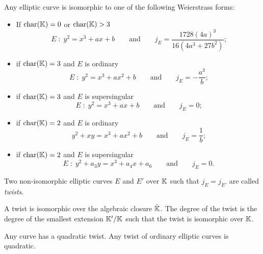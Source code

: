 \begin{proposition}
  Any elliptic curve is isomorphic to one of the following Weierstrass
  forms:
  \begin{itemize}
  \item If $\operatorname{char}(\mathbb{K})=0$ or $\operatorname{char}(\mathbb{K})>3$
    \begin{equation}
      \label{eq:weierstrass>3}
      E\;:\;y^2 = x^3 + ax + b 
      \qquad\text{and}\qquad
      j_E = \frac{1728(4a)^3}{16(4a^3 + 27b^2)}
      \text{;}
    \end{equation}
  \item if $\operatorname{char}(\mathbb{K})=3$ and $E$ is ordinary
    \begin{equation}
      \label{eq:weierstrass=3}
      E\;:\;y^2 = x^3 + ax^2 + b
      \qquad\text{and}\qquad
      j_E = -\frac{a^3}{b}
      \text{;}
    \end{equation}
  \item if $\operatorname{char}(\mathbb{K})=3$ and $E$ is supersingular
    \begin{equation}
      \label{eq:136}
      E\;:\;y^2=x^3 + ax+b
      \qquad\text{and}\qquad
      j_E=0
      \text{;}
    \end{equation}
  \item if $\operatorname{char}(\mathbb{K})=2$ and $E$ is ordinary
    \begin{equation}
      \label{eq:weierstrass=2}
      y^2 + xy = x^3 + ax^2 + b
      \qquad\text{and}\qquad
      j_E = \frac{1}{b}
      \text{;}
    \end{equation}
  \item if $\operatorname{char}(\mathbb{K})=2$ and $E$ is supersingular
    \begin{equation}
      \label{eq:137}
      E\;:\; y^2 + a_3y = x^3 + a_4x + a_6
      \qquad\text{and}\qquad
      j_E = 0
      \text{.}
    \end{equation}
  \end{itemize}
\end{proposition}

\begin{definition}[Twist]
  Two non-isomorphic elliptic curves $E$ and $E'$ over $\mathbb{K}$ such that
  $j_E=j_{E'}$ are called \emph{twists}.
\end{definition}

A twist is isomorphic over the algebraic closure $\bar{\mathbb{K}}$. The
degree of the twist is the degree of the
smallest extension $\mathbb{K}'/\mathbb{K}$ such that the twist is isomorphic over
$\mathbb{K}$.

\begin{proposition}
  Any curve has a quadratic twist. Any twist of ordinary elliptic
  curves is quadratic.
\end{proposition}


